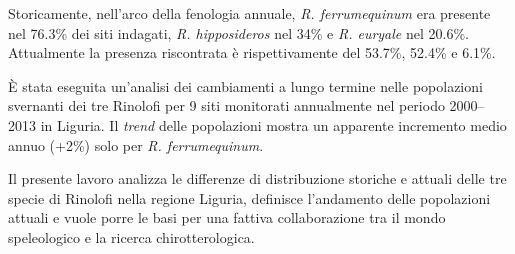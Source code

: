 {Storicamente, nell’arco della fenologia annuale, \emph{R. ferrumequinum} era presente nel 76.3\% dei siti indagati, \emph{R. hipposideros} nel 34\% e \emph{R. euryale} nel 20.6\%. Attualmente la presenza riscontrata è rispettivamente del 53.7\%, 52.4\% e 6.1\%.

È stata eseguita un'analisi dei cambiamenti a lungo termine nelle popolazioni svernanti dei tre Rinolofi per 9 siti monitorati annualmente nel periodo 2000--2013 in Liguria. Il \textit{trend} delle popolazioni mostra un apparente incremento medio annuo (+2\%) solo per \emph{R. ferrumequinum}.

Il presente lavoro analizza le differenze di distribuzione storiche e attuali delle tre specie di Rinolofi nella regione Liguria, definisce l’andamento delle popolazioni attuali e vuole porre le basi per una fattiva collaborazione tra il mondo speleologico e la ricerca chirotterologica.
} %
